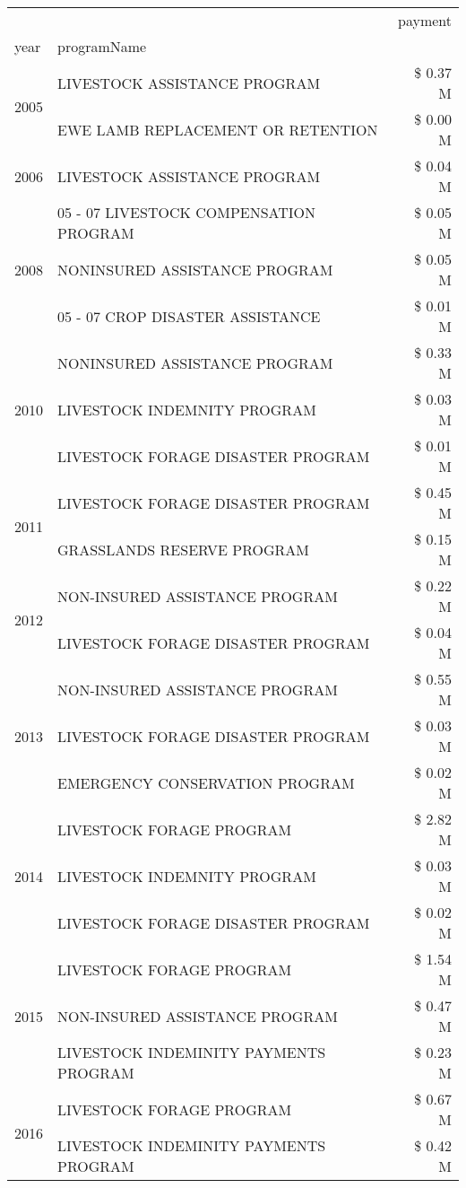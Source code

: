 \begin{tabular}{llr}
\toprule
 &  & payment \\
year & programName &  \\
\midrule
\multirow[t]{2}{*}{2005} & LIVESTOCK ASSISTANCE PROGRAM & \$ 0.37 M \\
 & EWE LAMB REPLACEMENT OR RETENTION & \$ 0.00 M \\
\cline{1-3}
2006 & LIVESTOCK ASSISTANCE PROGRAM & \$ 0.04 M \\
\cline{1-3}
\multirow[t]{3}{*}{2008} & 05 - 07 LIVESTOCK COMPENSATION PROGRAM & \$ 0.05 M \\
 & NONINSURED ASSISTANCE PROGRAM & \$ 0.05 M \\
 & 05 - 07 CROP DISASTER ASSISTANCE & \$ 0.01 M \\
\cline{1-3}
\multirow[t]{3}{*}{2010} & NONINSURED ASSISTANCE PROGRAM & \$ 0.33 M \\
 & LIVESTOCK INDEMNITY PROGRAM & \$ 0.03 M \\
 & LIVESTOCK FORAGE DISASTER PROGRAM & \$ 0.01 M \\
\cline{1-3}
\multirow[t]{2}{*}{2011} & LIVESTOCK FORAGE DISASTER PROGRAM & \$ 0.45 M \\
 & GRASSLANDS RESERVE PROGRAM & \$ 0.15 M \\
\cline{1-3}
\multirow[t]{2}{*}{2012} & NON-INSURED ASSISTANCE PROGRAM & \$ 0.22 M \\
 & LIVESTOCK FORAGE DISASTER PROGRAM & \$ 0.04 M \\
\cline{1-3}
\multirow[t]{3}{*}{2013} & NON-INSURED ASSISTANCE PROGRAM & \$ 0.55 M \\
 & LIVESTOCK FORAGE DISASTER PROGRAM & \$ 0.03 M \\
 & EMERGENCY CONSERVATION PROGRAM & \$ 0.02 M \\
\cline{1-3}
\multirow[t]{3}{*}{2014} & LIVESTOCK FORAGE PROGRAM & \$ 2.82 M \\
 & LIVESTOCK INDEMNITY PROGRAM & \$ 0.03 M \\
 & LIVESTOCK FORAGE DISASTER PROGRAM & \$ 0.02 M \\
\cline{1-3}
\multirow[t]{3}{*}{2015} & LIVESTOCK FORAGE PROGRAM & \$ 1.54 M \\
 & NON-INSURED ASSISTANCE PROGRAM & \$ 0.47 M \\
 & LIVESTOCK INDEMINITY PAYMENTS PROGRAM & \$ 0.23 M \\
\cline{1-3}
\multirow[t]{2}{*}{2016} & LIVESTOCK FORAGE PROGRAM & \$ 0.67 M \\
 & LIVESTOCK INDEMINITY PAYMENTS PROGRAM & \$ 0.42 M \\

\end{tabular}

